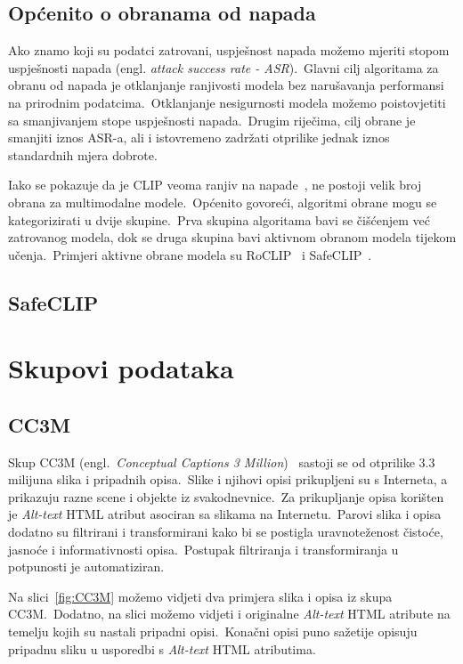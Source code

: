 \documentclass[times, utf8, seminar, numeric]{fer}
\begin{document}
\section{Općenito o obranama od napada}

Ako znamo koji su podatci zatrovani, uspješnost napada možemo mjeriti stopom uspješnosti napada (engl. \textit{attack success rate - ASR}).\ 
Glavni cilj algoritama za obranu od napada je otklanjanje ranjivosti modela bez narušavanja performansi na prirodnim podatcima.\ 
Otklanjanje nesigurnosti modela možemo poistovjetiti sa smanjivanjem stope uspješnosti napada.\ Drugim riječima, cilj obrane je smanjiti iznos ASR-a, ali i istovremeno zadržati otprilike jednak iznos standardnih mjera dobrote.\ 
  
Iako se pokazuje da je CLIP veoma ranjiv na napade~\cite{carlini2021poisoning}, ne postoji velik broj obrana za multimodalne modele.\ 
Općenito govoreći, algoritmi obrane mogu se kategorizirati u dvije skupine.\ 
Prva skupina algoritama bavi se čišćenjem već zatrovanog modela, dok se druga skupina bavi aktivnom obranom modela tijekom učenja.\ 
Primjeri aktivne obrane modela su RoCLIP~\cite{yang2023robust} i SafeCLIP~\cite{yang2023better}.\

\section{SafeCLIP}



\chapter{Skupovi podataka}

\section{CC3M}

Skup CC3M (engl.\ \textit{Conceptual Captions 3 Million})~\cite{sharma2018conceptual} sastoji se od otprilike 3.3 milijuna slika i pripadnih opisa.\ 
Slike i njihovi opisi prikupljeni su s Interneta, a prikazuju razne scene i objekte iz svakodnevnice.\ Za prikupljanje opisa korišten je \textit{Alt-text} HTML atribut asociran sa slikama na Internetu.\ 
Parovi slika i opisa dodatno su filtrirani i transformirani kako bi se postigla uravnoteženost čistoće, jasnoće i informativnosti opisa.\ Postupak filtriranja i transformiranja u potpunosti je automatiziran.\ 

Na slici~\ref{fig:CC3M} možemo vidjeti dva primjera slika i opisa iz skupa CC3M.\ Dodatno, na slici možemo vidjeti i originalne \textit{Alt-text} HTML atribute na temelju kojih su nastali pripadni opisi.\
Konačni opisi puno sažetije opisuju pripadnu sliku u usporedbi s \textit{Alt-text} HTML atributima.\
\end{document}
